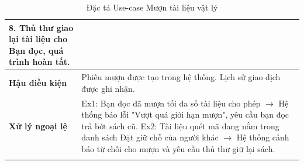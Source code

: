 \begin{longtable}{|p{3.5cm}|p{11.5cm}|}
    8. Thủ thư giao lại tài liệu cho Bạn đọc, quá trình hoàn tất. \\
    \hline
    \textbf{Hậu điều kiện} & Phiếu mượn được tạo trong hệ thống. Lịch sử giao dịch được ghi nhận. \\
    \hline
    \textbf{Xử lý ngoại lệ} & 
    Ex1: Bạn đọc đã mượn tối đa số tài liệu cho phép $\rightarrow$ Hệ thống báo lỗi "Vượt quá giới hạn mượn", yêu cầu bạn đọc trả bớt sách cũ.\newline
    Ex2: Tài liệu quét mã đang nằm trong danh sách Đặt giữ chỗ của người khác $\rightarrow$ Hệ thống cảnh báo từ chối cho mượn và yêu cầu thủ thư giữ lại sách. \\
    \hline
    \caption{Đặc tả Use-case Mượn tài liệu vật lý}
\end{longtable}

\newpage
